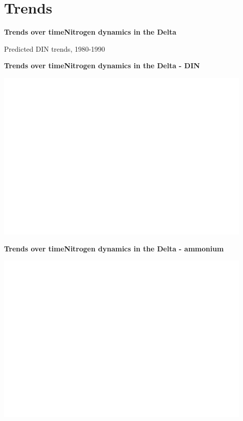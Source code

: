 \documentclass[serif]{beamer}\usepackage[]{graphicx}\usepackage[]{color}
\begin{document}
\section{Trends}



\begin{frame}{\textbf{Trends over time}}{\textbf{Nitrogen dynamics in the Delta}} 
{\bf \centerline{Predicted DIN trends, 1980-1990}}
\vspace{0.05in}
\centerline{
}
\end{frame}



\begin{frame}{\textbf{Trends over time}}{\textbf{Nitrogen dynamics in the Delta - DIN}} 
\centerline{\includegraphics[width = 0.93\textwidth, page = 2]{fig/trndsperdin.pdf}}
\end{frame}

\begin{frame}{\textbf{Trends over time}}{\textbf{Nitrogen dynamics in the Delta - ammonium}} 
\centerline{\includegraphics[width = 0.93\textwidth, page = 2]{fig/trndspernh.pdf}}
\end{frame}
\end{document}
